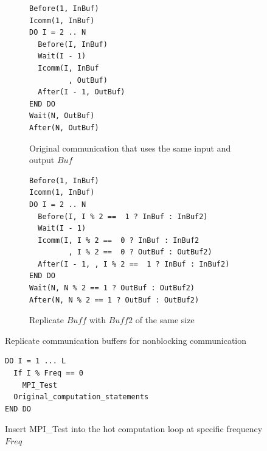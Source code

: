 \begin{figure}
{\scriptsize
  \centering
  \begin{subfigure}[b]{.35\textwidth}
\begin{verbatim}
Before(1, InBuf)
Icomm(1, InBuf)
DO I = 2 .. N
  Before(I, InBuf)
  Wait(I - 1)
  Icomm(I, InBuf
         , OutBuf)
  After(I - 1, OutBuf)
END DO
Wait(N, OutBuf)
After(N, OutBuf)
\end{verbatim}
    \caption{Original communication that uses the same input and output $Buf$}
    \label{fig:cco:dup:a}
  \end{subfigure}
  \hspace{.01in}
  \begin{subfigure}[b]{.35\textwidth}
\begin{verbatim}
Before(1, InBuf)
Icomm(1, InBuf)
DO I = 2 .. N
  Before(I, I % 2 ==  1 ? InBuf : InBuf2)
  Wait(I - 1)
  Icomm(I, I % 2 ==  0 ? InBuf : InBuf2
         , I % 2 ==  0 ? OutBuf : OutBuf2)
  After(I - 1, , I % 2 ==  1 ? InBuf : InBuf2)
END DO
Wait(N, N % 2 == 1 ? OutBuf : OutBuf2)
After(N, N % 2 == 1 ? OutBuf : OutBuf2)
\end{verbatim}
    \caption{Replicate $Buff$ with $Buff2$ of the same size}
    \label{fig:cco:dup:b}
  \end{subfigure}
\caption{Replicate communication buffers for nonblocking communication}
\label{fig:cco:dup}
}
\end{figure}

\begin{figure}[h]
{\scriptsize
\begin{verbatim}
DO I = 1 ... L
  If I % Freq == 0
    MPI_Test
  Original_computation_statements
END DO
\end{verbatim}
}
\caption{Insert MPI\_Test into the hot computation loop at specific frequency $Freq$}
\label{fig:cco:test}
\end{figure}

